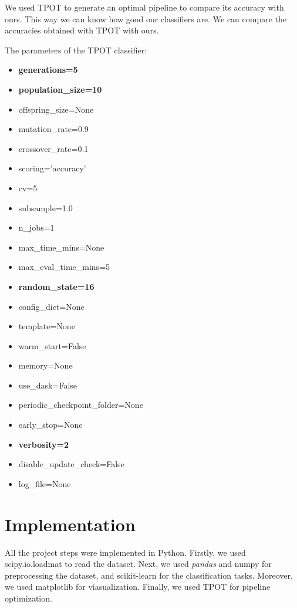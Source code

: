 \documentclass{article} %
\begin{document}
We used TPOT to generate an optimal pipeline to compare its accuracy with ours. This way we can know how good our classifiers are. We can compare the accuracies obtained with TPOT with ours.

The parameters of the TPOT classifier:
\begin{multicols}{2}
\begin{itemize}
    \item \textbf{generations=5}
    \item \textbf{population\_size=10}
    \item offspring\_size=None 
    \item mutation\_rate=0.9
    \item crossover\_rate=0.1
    \item scoring='accuracy'
    \item cv=5
    \item subsample=1.0
    \item n\_jobs=1
    \item max\_time\_mins=None
    \item max\_eval\_time\_mins=5
    \item \textbf{random\_state=16}
    \item config\_dict=None
    \item template=None
    \item warm\_start=False
    \item memory=None
    \item use\_dask=False
    \item periodic\_checkpoint\_folder=None
    \item early\_stop=None
    \item \textbf{verbosity=2}
    \item disable\_update\_check=False
    \item log\_file=None
\end{itemize}
\end{multicols}
 
\section{Implementation}

All the project steps were implemented in Python. Firstly, we used scipy.io.loadmat to read the dataset. Next, we used \textit{pandas} and numpy for preprocessing the dataset, and scikit-learn for the classification tasks. Moreover, we used matplotlib for viasualization. Finally, we used TPOT for pipeline optimization.
\end{document}
